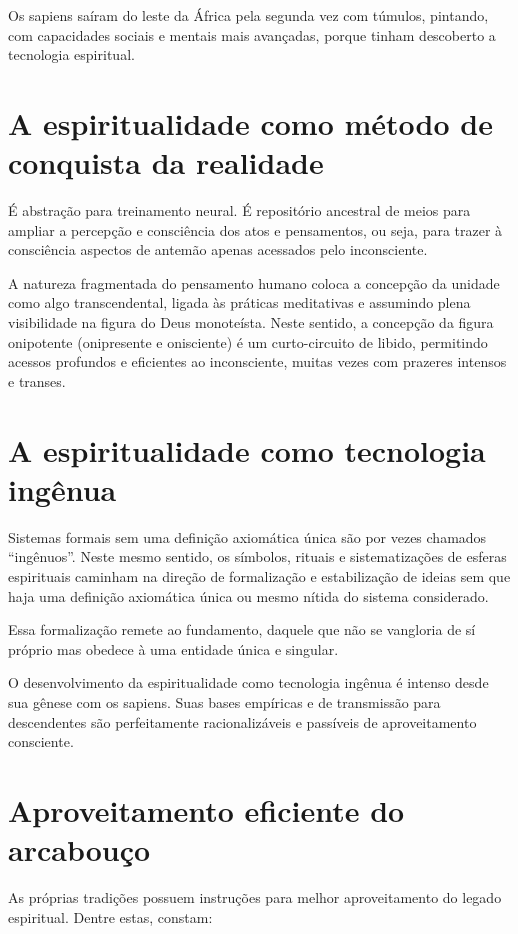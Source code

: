 \documentclass[a4paper]{article}
\begin{document}
\qquad Os sapiens saíram do leste da África pela segunda vez com túmulos,
pintando, com capacidades sociais e mentais mais avançadas, porque tinham
descoberto a tecnologia espiritual.

\section{A espiritualidade como método de conquista da realidade}\label{met}

\qquad É abstração para treinamento neural. É repositório ancestral de meios
para ampliar a percepção e consciência dos atos e pensamentos, ou seja, para
trazer à consciência aspectos de antemão apenas acessados pelo inconsciente.

A natureza fragmentada do pensamento humano coloca a concepção da unidade como
algo transcendental, ligada às práticas meditativas e assumindo plena
visibilidade na figura do Deus monoteísta. Neste sentido, a concepção da figura
onipotente (onipresente e onisciente) é um curto-circuito de libido, permitindo
acessos profundos e eficientes ao inconsciente, muitas vezes com prazeres
intensos e transes.

\section{A espiritualidade como tecnologia ingênua}

\qquad Sistemas formais sem uma definição axiomática única são por vezes
chamados ``ingênuos''. Neste mesmo sentido, os símbolos, rituais e
sistematizações de esferas espirituais caminham na direção de formalização e
estabilização de ideias sem que haja uma definição axiomática única ou mesmo
nítida do sistema considerado.

Essa formalização remete ao fundamento, daquele que não se vangloria de sí
próprio mas obedece à uma entidade única e singular.

O desenvolvimento da espiritualidade como tecnologia ingênua é intenso desde sua
gênese com os sapiens. Suas bases empíricas e de transmissão para descendentes
são perfeitamente racionalizáveis e passíveis de aproveitamento consciente.

\section{Aproveitamento eficiente do arcabouço}

\qquad As próprias tradições possuem instruções para melhor aproveitamento do
legado espiritual. Dentre estas, constam:
\end{document}
